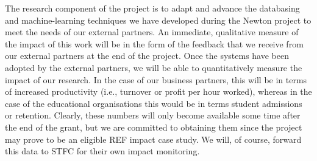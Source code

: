 \documentclass[11pt]{article}
\begin{document}
  \vspace{2mm}
  \noindent
  The research component of the project is to adapt and advance the databasing and machine-learning techniques we have developed during the Newton project to meet the needs of our external partners. An immediate, qualitative measure of the impact of this work will be in the form of the feedback that we receive from our external partners at the end of the project. Once the systems have been adopted by the external partners, we will be able to quantitatively measure the impact of our research. In the case of our business partners, this will be in terms of increased productivity (i.e., turnover or profit per hour worked), whereas in the case of the educational organisations this would be in terms student admissions or retention. Clearly, these numbers will only become available some time after the end of the grant, but we are committed to obtaining them since the project may prove to be an eligible REF impact case study. We will, of course, forward this data to STFC for their own impact monitoring.
  
  
\end{document}
